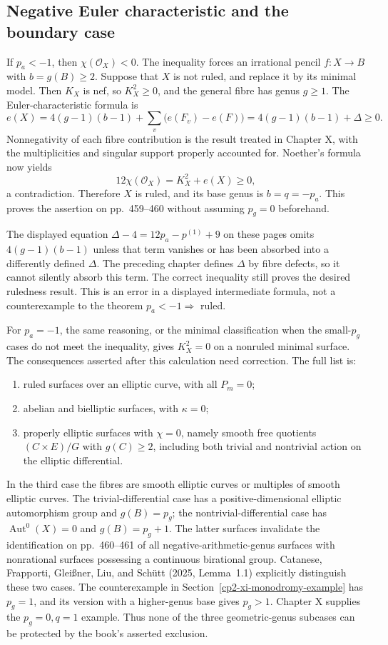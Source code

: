 \subsection{Negative Euler characteristic and the boundary case}

If \(p_a<-1\), then \(\chi(\mathcal O_X)<0\). The inequality forces an irrational pencil \(f:X\to B\) with \(b=g(B)\ge2\). Suppose that \(X\) is not ruled, and replace it by its minimal model. Then \(K_X\) is nef, so \(K_X^2\ge0\), and the general fibre has genus \(g\ge1\). The Euler-characteristic formula is
\[
e(X)=4(g-1)(b-1)+\sum_v\bigl(e(F_v)-e(F)\bigr)
=4(g-1)(b-1)+\Delta\ge0.
\]
Nonnegativity of each fibre contribution is the result treated in Chapter X, with the multiplicities and singular support properly accounted for. Noether's formula now yields
\[
12\chi(\mathcal O_X)=K_X^2+e(X)\ge0,
\]
a contradiction. Therefore \(X\) is ruled, and its base genus is \(b=q=-p_a\). This proves the assertion on pp.~459--460 without assuming \(p_g=0\) beforehand.

The displayed equation \(\Delta-4=12p_a-p^{(1)}+9\) on these pages omits \(4(g-1)(b-1)\) unless that term vanishes or has been absorbed into a differently defined \(\Delta\). The preceding chapter defines \(\Delta\) by fibre defects, so it cannot silently absorb this term. The correct inequality still proves the desired ruledness result. This is an error in a displayed intermediate formula, not a counterexample to the theorem \(p_a<-1\Rightarrow\) ruled.

For \(p_a=-1\), the same reasoning, or the minimal classification when the small-\(p_g\) cases do not meet the inequality, gives \(K_X^2=0\) on a nonruled minimal surface. The consequences asserted after this calculation need correction. The full list is:
\begin{enumerate}
\item ruled surfaces over an elliptic curve, with all \(P_m=0\);
\item abelian and bielliptic surfaces, with \(\kappa=0\);
\item properly elliptic surfaces with \(\chi=0\), namely smooth free quotients \( (C\times E)/G\) with \(g(C)\ge2\), including both trivial and nontrivial action on the elliptic differential.
\end{enumerate}
In the third case the fibres are smooth elliptic curves or multiples of smooth elliptic curves. The trivial-differential case has a positive-dimensional elliptic automorphism group and \(g(B)=p_g\); the nontrivial-differential case has \(\operatorname{Aut}^0(X)=0\) and \(g(B)=p_g+1\). The latter surfaces invalidate the identification on pp.~460--461 of all negative-arithmetic-genus surfaces with nonrational surfaces possessing a continuous birational group. Catanese, Frapporti, Glei\ss ner, Liu, and Sch\"utt (2025, Lemma~1.1) explicitly distinguish these two cases. The counterexample in Section~\ref{cp2-xi-monodromy-example} has \(p_g=1\), and its version with a higher-genus base gives \(p_g>1\). Chapter X supplies the \(p_g=0,q=1\) example. Thus none of the three geometric-genus subcases can be protected by the book's asserted exclusion.

